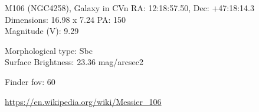 \begin{block}{M106 (NGC4258), Galaxy in CVn}
    RA: 12:18:57.50, Dec: +47:18:14.3 \\ 
    Dimensions: 16.98 x 7.24 PA: 150 \\ 
    Magnitude (V): 9.29

    Morphological type: Sbc \\ 
    Surface Brightness: 23.36 mag/arcsec2 


    Finder fov: 60 

    \url{https://en.wikipedia.org/wiki/Messier_106} 
\end{block}